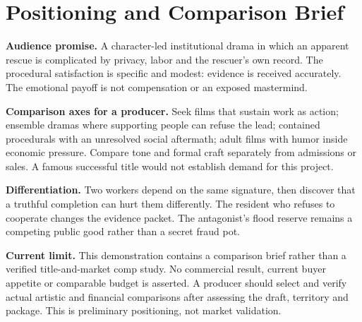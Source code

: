 \section{Positioning and Comparison Brief}
\textbf{Audience promise.} A character-led institutional drama in which an apparent rescue is complicated by privacy, labor and the rescuer's own record. The procedural satisfaction is specific and modest: evidence is received accurately. The emotional payoff is not compensation or an exposed mastermind.

\textbf{Comparison axes for a producer.} Seek films that sustain work as action; ensemble dramas where supporting people can refuse the lead; contained procedurals with an unresolved social aftermath; adult films with humor inside economic pressure. Compare tone and formal craft separately from admissions or sales. A famous successful title would not establish demand for this project.

\textbf{Differentiation.} Two workers depend on the same signature, then discover that a truthful completion can hurt them differently. The resident who refuses to cooperate changes the evidence packet. The antagonist's flood reserve remains a competing public good rather than a secret fraud pot.

\textbf{Current limit.} This demonstration contains a comparison brief rather than a verified title-and-market comp study. No commercial result, current buyer appetite or comparable budget is asserted. A producer should select and verify actual artistic and financial comparisons after assessing the draft, territory and package. This is preliminary positioning, not market validation.

